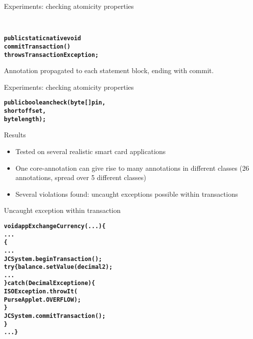 \documentclass[final,nocolorBG,a4,marieke,nototal,ps, accumulate,slideColor]{prosper}
\begin{document}
\begin{slide}{Experiments: checking atomicity properties}

\smallskip\\

\begin{alltt}
\textbf{
public static native void 
   commitTransaction() 
         throws TransactionException;}
\end{alltt}
Annotation propagated to each statement block, ending with commit.
\end{slide}

\begin{slide}{Experiments: checking atomicity properties}
\smallskip\\

\begin{alltt}
\textbf{
public boolean check(byte[] pin, 
                     short offset, 
                     byte length);}
\end{alltt}
\end{slide}

\begin{slide}{Results}
\begin{itemize}
\item Tested on several realistic smart card applications
\item One core-annotation can give rise to many annotations in
different classes (26 annotations, spread over 5 different classes)
\item Several violations found: uncaught exceptions possible within
transactions 
\end{itemize}
\end{slide}

\begin{slide}{Uncaught exception within transaction}
\begin{alltt}
\textbf{void appExchangeCurrency(...) \{
   ...
    \{
      ...
      JCSystem.beginTransaction();	
      try \{balance.setValue(decimal2);
            ...
      \} catch (DecimalException e) \{
         ISOException.throwIt(
              PurseApplet.OVERFLOW);
      \}
      JCSystem.commitTransaction();
   \}
   ...\}}
\end{alltt}
\end{slide}
\end{document}
